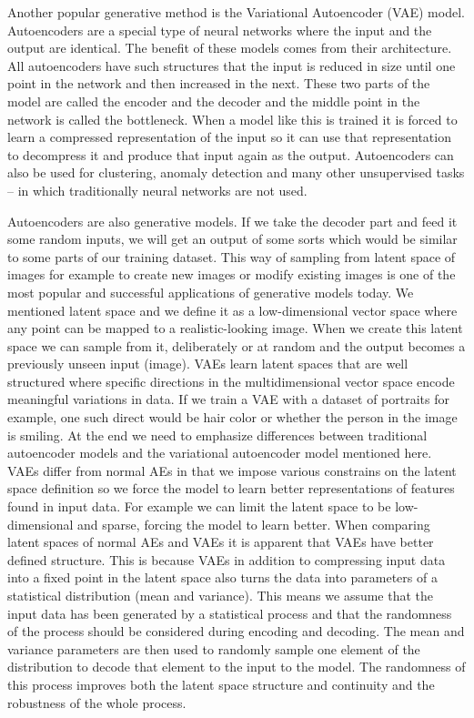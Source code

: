 \documentclass[b5paper]{book}
\begin{document}
Another popular generative method is the Variational Autoencoder (VAE) model. Autoencoders are a special type of neural networks where the input and the output are identical. The benefit of these models comes from their architecture. All autoencoders have such structures that the input is reduced in size until one point in the network and then increased in the next. These two parts of the model are called the encoder and the decoder and the middle point in the network is called the bottleneck. When a model like this is trained it is forced to learn a compressed representation of the input so it can use that representation to decompress it and produce that input again as the output. Autoencoders can also be used for clustering, anomaly detection and many other unsupervised tasks -- in which traditionally neural networks are not used. 

Autoencoders are also generative models. If we take the decoder part and feed it some random inputs, we will get an output of some sorts which would be similar to some parts of our training dataset. This way of sampling from latent space of images for example to create new images or modify existing images is one of the most popular and successful applications of generative models today. We mentioned latent space and we define it as a low-dimensional vector space where any point can be mapped to a realistic-looking image. When we create this latent space we can sample from it, deliberately or at random and the output becomes a previously unseen input (image). VAEs learn latent spaces that are well structured where specific directions in the multidimensional vector space encode meaningful variations in data. If we train a VAE with a dataset of portraits for example, one such direct would be hair color or whether the person in the image is smiling. At the end we need to emphasize differences between traditional autoencoder models and the variational autoencoder model mentioned here. VAEs differ from normal AEs in that we impose various constrains on the latent space definition so we force the model to learn better representations of features found in input data. For example we can limit the latent space to be low-dimensional and sparse, forcing the model to learn better. When comparing latent spaces of normal AEs and VAEs it is apparent that VAEs have better defined structure. This is because VAEs in addition to compressing input data into a fixed point in the latent space also turns the data into parameters of a statistical distribution (mean and variance). This means we assume that the input data has been generated by a statistical process and that the randomness of the process should be considered during encoding and decoding. The mean and variance parameters are then used to randomly sample one element of the distribution to decode that element to the input to the model. The randomness of this process improves both the latent space structure and continuity and the robustness of the whole process.
\end{document}

